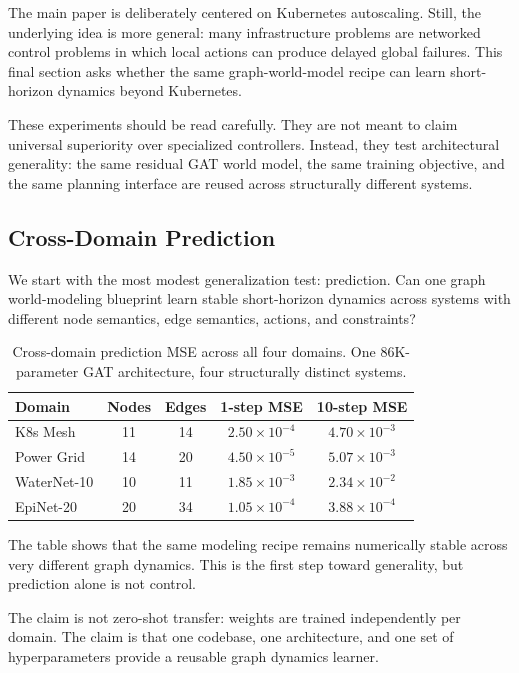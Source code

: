 The main paper is deliberately centered on Kubernetes autoscaling.  Still,
the underlying idea is more general: many infrastructure problems are
networked control problems in which local actions can produce delayed
global failures.  This final section asks whether the same
graph-world-model recipe can learn short-horizon dynamics beyond
Kubernetes.

These experiments should be read carefully.  They are not meant to claim
universal superiority over specialized controllers.  Instead, they test
architectural generality: the same residual GAT world model, the same
training objective, and the same planning interface are reused across
structurally different systems.

\subsection{Cross-Domain Prediction}
\label{app:cross-domain-prediction}

We start with the most modest generalization test: prediction.  Can one
graph world-modeling blueprint learn stable short-horizon dynamics across
systems with different node semantics, edge semantics, actions, and
constraints?

\begin{table}[H]
\centering
\small
\caption{Cross-domain prediction MSE across all four domains.
One 86K-parameter GAT architecture, four structurally distinct systems.}
\label{tab:water-epinet-mse}
\begin{tabular}{@{}lcccc@{}}
\toprule
Domain & Nodes & Edges & 1-step MSE & 10-step MSE \\
\midrule
K8s Mesh       & 11 & 14 & $2.50\!\times\!10^{-4}$ & $4.70\!\times\!10^{-3}$ \\
Power Grid     & 14 & 20 & $4.50\!\times\!10^{-5}$ & $5.07\!\times\!10^{-3}$ \\
WaterNet-10    & 10 & 11 & $1.85\!\times\!10^{-3}$ & $2.34\!\times\!10^{-2}$ \\
EpiNet-20      & 20 & 34 & $1.05\!\times\!10^{-4}$ & $3.88\!\times\!10^{-4}$ \\
\bottomrule
\end{tabular}
\end{table}

The table shows that the same modeling recipe remains numerically stable
across very different graph dynamics.  This is the first step toward
generality, but prediction alone is not control.

The claim is not zero-shot transfer: weights are trained independently
per domain.  The claim is that one codebase, one architecture, and one
set of hyperparameters provide a reusable graph dynamics learner.

